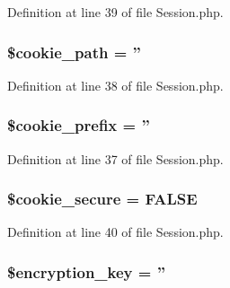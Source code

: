 Definition at line 39 of file Session.\-php.

\hypertarget{class_c_i___session_a306f5cca27534399088154892069210c}{
\subsubsection[{\$cookie\-\_\-path}]{\setlength{\rightskip}{0pt plus 5cm}\$cookie\-\_\-path = ''}}\label{class_c_i___session_a306f5cca27534399088154892069210c}


Definition at line 38 of file Session.\-php.

\hypertarget{class_c_i___session_ada115919bde6b8248b4326b5fbd8a618}{
\subsubsection[{\$cookie\-\_\-prefix}]{\setlength{\rightskip}{0pt plus 5cm}\$cookie\-\_\-prefix = ''}}\label{class_c_i___session_ada115919bde6b8248b4326b5fbd8a618}


Definition at line 37 of file Session.\-php.

\hypertarget{class_c_i___session_a34b1dc25271af52f269a649392ce8d43}{
\subsubsection[{\$cookie\-\_\-secure}]{\setlength{\rightskip}{0pt plus 5cm}\$cookie\-\_\-secure = F\-A\-L\-S\-E}}\label{class_c_i___session_a34b1dc25271af52f269a649392ce8d43}


Definition at line 40 of file Session.\-php.

\hypertarget{class_c_i___session_a35bbf76a5bcca90ca9b39368ed28121c}{
\subsubsection[{\$encryption\-\_\-key}]{\setlength{\rightskip}{0pt plus 5cm}\$encryption\-\_\-key = ''}}\label{class_c_i___session_a35bbf76a5bcca90ca9b39368ed28121c}


